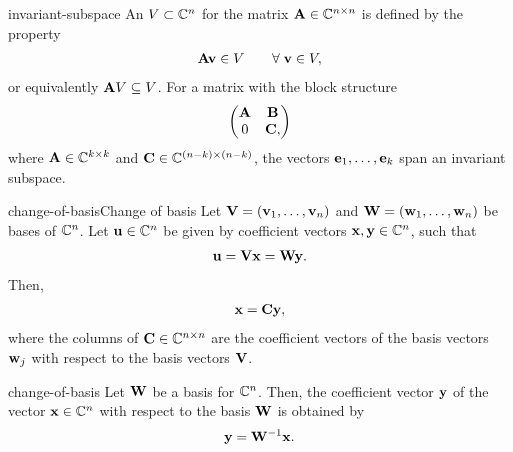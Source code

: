 \begin{Definition}{invariant-subspace}
  An  $V\subset\mathbb C^n$ for the matrix
  $\mathbf A\in\mathbb C^{n\times n}$ is defined by the property
  \begin{gather}
    \mathbf A\mathbf v \in V \qquad \forall\;\mathbf v\in V,
  \end{gather}
  or equivalently $\mathbf A V \subseteq V$.
  For a matrix with the block structure
  \begin{gather}
    \begin{pmatrix}
      \mathbf A & \mathbf B\\ 0 & \mathbf C,
    \end{pmatrix}
  \end{gather}
  where $\mathbf A\in\mathbb C^{k\times k}$ and $\mathbf C\in\mathbb C^{(n-k)\times (n-k)}$,
  the vectors $\mathbf e_{1},\dots,\mathbf e_{k}$ span an invariant subspace.
\end{Definition}

\begin{Lemma*}{change-of-basis}{Change of basis}
  Let $\mathbf V = (\mathbf v_1,\dots, \mathbf v_n)$ and $\mathbf W = (\mathbf w_1,\dots, \mathbf w_n)$ be
  bases of $\mathbb C^n$. Let $\mathbf u\in \mathbb C^n$ be given by coefficient vectors
  $\mathbf x,\mathbf y\in \mathbb C^n$, such that
  \begin{gather}
    \mathbf u = \mathbf V\mathbf x = \mathbf W\mathbf y.
  \end{gather}
  Then,
  \begin{gather}
    \mathbf x = \mathbf C \mathbf y,
  \end{gather}
  where the columns of $\mathbf C\in \mathbb C^{n\times n}$ are the coefficient
  vectors of the basis vectors $\mathbf w_j$ with respect to the basis
  vectors $\mathbf V$.
\end{Lemma*}

\begin{Corollary}{change-of-basis}
  Let $\mathbf W$ be a basis for $\mathbb C^n$. Then, the coefficient vector
  $\mathbf y$ of the vector $\mathbf x \in\mathbb C^n$ with respect to the basis $\mathbf W$
  is obtained by
  \begin{gather}
    \mathbf y = \mathbf W^{-1} \mathbf x.
  \end{gather}
\end{Corollary}

